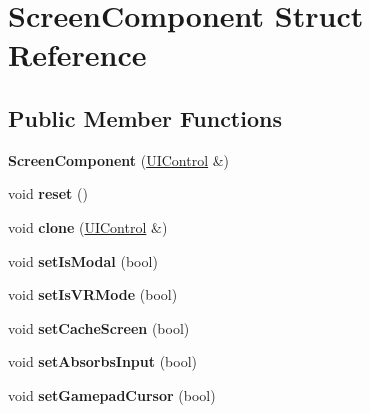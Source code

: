 \hypertarget{struct_screen_component}{}\section{Screen\+Component Struct Reference}
\label{struct_screen_component}
\subsection*{Public Member Functions}
\begin{DoxyCompactItemize}
\item 
\mbox{\label{struct_screen_component_a876fbd9106ac8ba0ec25d94c7fbbfac8}} 
{\bfseries Screen\+Component} (\mbox{\hyperlink{struct_u_i_control}{U\+I\+Control}} \&)
\item 
\mbox{\label{struct_screen_component_a4f0305db50387712c1e67a2b90b155a6}} 
void {\bfseries reset} ()
\item 
\mbox{\label{struct_screen_component_a191427e3364a34490b26d3fa5d19e4e8}} 
void {\bfseries clone} (\mbox{\hyperlink{struct_u_i_control}{U\+I\+Control}} \&)
\item 
\mbox{\label{struct_screen_component_ab68ada223b13e97923fb6a2552405d77}} 
void {\bfseries set\+Is\+Modal} (bool)
\item 
\mbox{\label{struct_screen_component_a1450ed1adb104b7fa40e5c5c809f6317}} 
void {\bfseries set\+Is\+V\+R\+Mode} (bool)
\item 
\mbox{\label{struct_screen_component_a3781d86f42a198f35b3962c289a87da4}} 
void {\bfseries set\+Cache\+Screen} (bool)
\item 
\mbox{\label{struct_screen_component_af31fefe71425c8cbe39340e51e115229}} 
void {\bfseries set\+Absorbs\+Input} (bool)
\item 
\mbox{\label{struct_screen_component_a817dd832ff6a18858ec270c700eb58c8}} 
void {\bfseries set\+Gamepad\+Cursor} (bool)
\item 
\mbox{\label{struct_screen_component_a2aa6333008d0bd2dbd864fcdf191e70d}} 

\end{DoxyCompactItemize}
